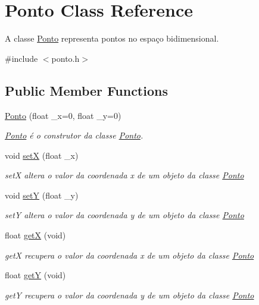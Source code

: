 \hypertarget{class_ponto}{}\section{Ponto Class Reference}
\label{class_ponto}


A classe \hyperlink{class_ponto}{Ponto} representa pontos no espaço bidimensional.  




{\ttfamily \#include $<$ponto.\+h$>$}

\subsection*{Public Member Functions}
\begin{DoxyCompactItemize}
\item 
\hyperlink{class_ponto_a5a157b4f3dc28842de40f505666f8899}{Ponto} (float \+\_\+x=0, float \+\_\+y=0)
\begin{DoxyCompactList}\small\item\em \hyperlink{class_ponto}{Ponto} é o construtor da classe \hyperlink{class_ponto}{Ponto}. \end{DoxyCompactList}\item 
void \hyperlink{class_ponto_a22129ad4dbf8019c479021d70a9f6774}{setX} (float \+\_\+x)
\begin{DoxyCompactList}\small\item\em setX altera o valor da coordenada x de um objeto da classe \hyperlink{class_ponto}{Ponto} \end{DoxyCompactList}\item 
void \hyperlink{class_ponto_a2d9e5b9fade9d3f3f21122a2dc2f5e11}{setY} (float \+\_\+y)
\begin{DoxyCompactList}\small\item\em setY altera o valor da coordenada y de um objeto da classe \hyperlink{class_ponto}{Ponto} \end{DoxyCompactList}\item 
float \hyperlink{class_ponto_a81256752897090e5424fdabb992407b5}{getX} (void)
\begin{DoxyCompactList}\small\item\em getX recupera o valor da coordenada x de um objeto da classe \hyperlink{class_ponto}{Ponto} \end{DoxyCompactList}\item 
float \hyperlink{class_ponto_a554a249ab828ccfd6173380a4d81010f}{getY} (void)
\begin{DoxyCompactList}\small\item\em getY recupera o valor da coordenada y de um objeto da classe \hyperlink{class_ponto}{Ponto} \end{DoxyCompactList}\item 

\end{DoxyCompactItemize}

